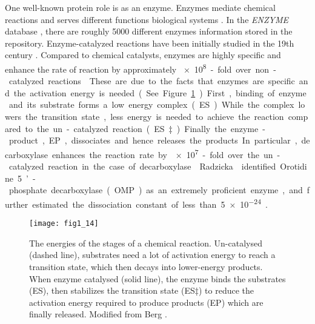 \begin{refsection}
One well-known protein role is as an enzyme. Enzymes mediate chemical
reactions and serves different functions biological
systems \cite{AthelCornish-Bowden2012,Stryer1995,Radzicka1995a}. In the
\emph{ENZYME} database \cite{Schomburg2004}, there are roughly 5000 different
enzymes information stored in the repository.  Enzyme-catalyzed reactions have
been initially studied in the 19th century \cite{AthelCornish-Bowden2012}.
Compared to chemical catalysts, enzymes are highly specific and enhance the
rate of reaction by approximately \SI{e8}-fold over non-catalyzed reactions
\cite{Stryer1995}. These are due to the facts that enzymes are specific and the
activation energy is needed. (See Figure \ref{fig:enzyme-intro}) First, binding
of enzyme and its substrate forms a low energy complex (ES).  While the complex
lowers the transition state, less energy is needed to achieve the reaction
compared to the un-catalyzed reaction (ES‡).  Finally the enzyme-product, EP,
dissociates and hence releases the products. In particular, decarboxylase
enhances the reaction rate by \SI{e7}-fold over the un-catalyzed reaction in
the case of decarboxylase \cite{Radzicka1995a}. Radzicka 
identified Orotidine 5\rq-phosphate decarboxylase (OMP) as an extremely
proficient enzyme, and further estimated the dissociation constant of less than
\SI{5e-24}{\Molar} \cite{Radzicka1995a}.
\begin{figure}[htbp] 
    \centering \texttt{[image: fig1\_14]}
    \caption[The energies of the stages of a chemical reaction. Uncatalysed
    (dashed line), substrates need a lot of activation energy to reach a
transition state, which then decays into lower-energy products. When enzyme
catalysed (solid line), the enzyme binds the substrates (ES), then stabilizes
the transition state (ES‡) to reduce the activation energy required to produce
products (EP) which are finally released.]{The energies of the stages of a
    chemical reaction. Un-catalysed (dashed line), substrates need a lot of
    activation energy to reach a transition state, which then decays into
    lower-energy products. When enzyme catalysed (solid line), the enzyme binds
    the substrates (ES), then stabilizes the transition state (ES‡) to reduce
    the activation energy required to produce products (EP) which are finally
    released. Modified from Berg  \cite{Berg2002}.} 
    \label{fig:enzyme-intro}
\end{figure}


\end{refsection}
